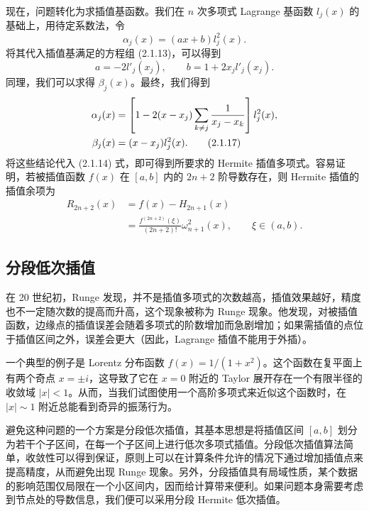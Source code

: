 现在，问题转化为求插值基函数。我们在 $n$ 次多项式 Lagrange 基函数 $l_j(x)$ 的基础上，用待定系数法，令
\begin{equation}
 \alpha_j(x)=(ax+b)l_j^2(x).
\tag{2.1.15}
\end{equation}
将其代入插值基满足的方程组 (2.1.13)，可以得到
\begin{equation}
 a=-2l'_j(x_j),\qquad b=1+2x_jl'_j(x_j).
\tag{2.1.16}
\end{equation}
同理，我们可以求得 $\beta_j(x)$。最终，我们得到
\begin{align}
 \alpha_j(x)&=\left[1-2(x-x_j)\sum_{k\ne j}\frac{1}{x_j-x_k}\right]l_j^2(x),\notag\\
 \beta_j(x)&=(x-x_j)l_j^2(x).
\tag{2.1.17}
\end{align}
将这些结论代入 (2.1.14) 式，即可得到所要求的 Hermite 插值多项式。容易证明，若被插值函数 $f(x)$ 在 $[a,b]$ 内的 $2n+2$ 阶导数存在，则 Hermite 插值的插值余项为
\begin{equation}
\begin{aligned}
 R_{2n+2}(x)&=f(x)-H_{2n+1}(x)\\
 &=\frac{f^{(2n+2)}(\xi)}{(2n+2)!}\omega_{n+1}^2(x),\qquad \xi\in(a,b).
\end{aligned}
\tag{2.1.18}
\end{equation}



\subsection{分段低次插值}

在 20 世纪初，Runge 发现，并不是插值多项式的次数越高，插值效果越好，精度也不一定随次数的提高而升高，这个现象被称为 Runge 现象。他发现，对被插值函数，边缘点的插值误差会随着多项式的阶数增加而急剧增加；如果需插值的点位于插值区间之外，误差会更大（因此，Lagrange 插值不能用于外插）。

一个典型的例子是 Lorentz 分布函数 $f(x)=1/(1+x^2)$。这个函数在复平面上有两个奇点 $x=\pm i$，这导致了它在 $x=0$ 附近的 Taylor 展开存在一个有限半径的收敛域 $|x|<1$。从而，当我们试图使用一个高阶多项式来近似这个函数时，在 $|x|\sim 1$ 附近总能看到奇异的振荡行为。

避免这种问题的一个方案是分段低次插值，其基本思想是将插值区间 $[a,b]$ 划分为若干个子区间，在每一个子区间上进行低次多项式插值。分段低次插值算法简单，收敛性可以得到保证，原则上可以在计算条件允许的情况下通过增加插值点来提高精度，从而避免出现 Runge 现象。另外，分段插值具有局域性质，某个数据的影响范围仅局限在一个小区间内，因而给计算带来便利。如果问题本身需要考虑到节点处的导数信息，我们便可以采用分段 Hermite 低次插值。

